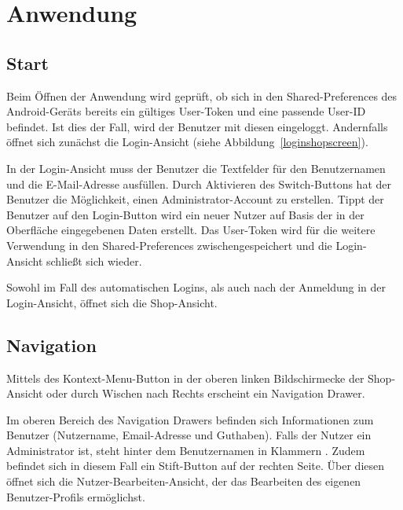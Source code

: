 \section{Anwendung}\label{sec:features}

\subsection{Start}\label{subsec:start}

Beim Öffnen der Anwendung wird geprüft, ob sich in den Shared-Preferences des Android-Geräts bereits ein gültiges User-Token und eine passende User-ID befindet.
Ist dies der Fall, wird der Benutzer mit diesen eingeloggt.
Andernfalls öffnet sich zunächst die Login-Ansicht (siehe Abbildung~\ref{loginshopscreen}).

In der Login-Ansicht muss der Benutzer die Textfelder für den Benutzernamen und die E-Mail-Adresse ausfüllen.
Durch Aktivieren des Switch-Buttons hat der Benutzer die Möglichkeit, einen Administrator-Account zu erstellen.
Tippt der Benutzer auf den Login-Button wird ein neuer Nutzer auf Basis der in der Oberfläche eingegebenen Daten erstellt.
Das User-Token wird für die weitere Verwendung in den Shared-Preferences zwischengespeichert und die Login-Ansicht schließt sich wieder.

Sowohl im Fall des automatischen Logins, als auch nach der Anmeldung in der Login-Ansicht, öffnet sich die Shop-Ansicht.


\subsection{Navigation} \label{subsec:navigation}

Mittels des Kontext-Menu-Button in der oberen linken Bildschirmecke der Shop-Ansicht oder durch Wischen nach Rechts erscheint ein Navigation Drawer.

Im oberen Bereich des Navigation Drawers befinden sich Informationen zum Benutzer (Nutzername, Email-Adresse und Guthaben).
Falls der Nutzer ein Administrator ist, steht hinter dem Benutzernamen in Klammern .
Zudem befindet sich in diesem Fall ein Stift-Button auf der rechten Seite.
Über diesen öffnet sich die Nutzer-Bearbeiten-Ansicht, der das Bearbeiten des eigenen Benutzer-Profils ermöglichst.

